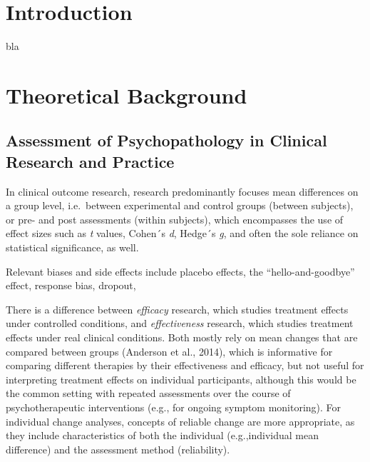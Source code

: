 \documentclass[12pt,twoside]{reedthesis}
\begin{document}
%
\mainmatter %
\pagestyle{fancyplain} %

\hypertarget{introduction}{%
\chapter{Introduction}\label{introduction}}

bla

\hypertarget{theoretical-background}{%
\chapter{Theoretical Background}\label{theoretical-background}}

\hypertarget{assessment-of-psychopathology-in-clinical-research-and-practice}{%
\section{Assessment of Psychopathology in Clinical Research and Practice}\label{assessment-of-psychopathology-in-clinical-research-and-practice}}

In clinical outcome research, research predominantly focuses mean differences on a group level, i.e.~between experimental and control groups (between subjects), or pre- and post assessments (within subjects), which encompasses the use of effect sizes such as \emph{t} values, Cohen´s \emph{d}, Hedge´s \emph{g}, and often the sole reliance on statistical significance, as well.

\par

Relevant biases and side effects include placebo effects, the \enquote{hello-and-goodbye} effect, response bias, dropout,

\par

There is a difference between \emph{efficacy} research, which studies treatment effects under controlled conditions, and \emph{effectiveness} research, which studies treatment effects under real clinical conditions. Both mostly rely on mean changes that are compared between groups (Anderson et al., 2014), which is informative for comparing different therapies by their effectiveness and efficacy, but not useful for interpreting treatment effects on individual participants, although this would be the common setting with repeated assessments over the course of psychotherapeutic interventions (e.g., for ongoing symptom monitoring). For individual change analyses, concepts of reliable change are more appropriate, as they include characteristics of both the individual (e.g.,individual mean difference) and the assessment method (reliability).
\end{document}
